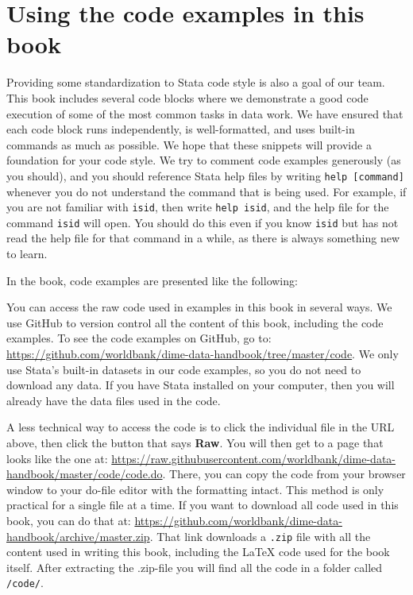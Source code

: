 \section{Using the code examples in this book}

Providing some standardization to Stata code style is also a goal of our team.
This book includes several code blocks
where we demonstrate a good code execution
of some of the most common tasks in data work.
We have ensured that each code block runs independently,
is well-formatted, 
and uses built-in commands as much as possible.
We hope that these snippets will provide a foundation for your code style.
We try to comment code examples generously (as you should),
and you should reference Stata help files by writing \texttt{help [command]}
whenever you do not understand the command that is being used.
For example, if you are not familiar with \texttt{isid},
 then write \texttt{help isid},
and the help file for the command \texttt{isid} will open.
You should do this even if you know \texttt{isid} 
but has not read the help file for that command in a while,
as there is always something new to learn.

In the book, code examples are presented like the following:


You can access the raw code used in examples in this book in several ways.
We use GitHub to version control all the content of this book,
including the code examples.
To see the code examples on GitHub, go to: 
\url{https://github.com/worldbank/dime-data-handbook/tree/master/code}.
We only use Stata's built-in datasets in our code examples,
so you do not need to download any data.
If you have Stata installed on your computer, 
then you will already have the data files used in the code.

A less technical way to access the code 
is to click the individual file in the URL above, then click
the button that says \textbf{Raw}. 
You will then get to a page that looks like the one at:
\url{https://raw.githubusercontent.com/worldbank/dime-data-handbook/master/code/code.do}.
There, you can copy the code 
from your browser window to your do-file editor with the formatting intact.
This method is only practical for a single file at a time.
If you want to download all code used in this book, you can do that at:
\url{https://github.com/worldbank/dime-data-handbook/archive/master.zip}. 
That link downloads a \texttt{.zip} file 
with all the content used in writing this book, 
including the \LaTeX{} code used for the book itself. 
After extracting the .zip-file you will find all the code in a folder called \texttt{/code/}.

